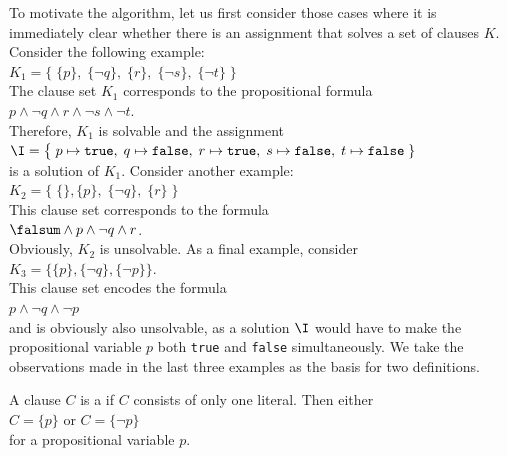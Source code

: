 To motivate the algorithm, let us first consider those cases where
it is immediately clear whether there is an assignment that solves a set of clauses $K$.
Consider the following example: \\[0.2cm]
\hspace*{1.3cm} 
$K_1 = \bigl\{\; \{p\},\; \{\neg q\},\; \{r\},\; \{\neg s\}, \; \{\neg t\} \;\bigr\}$ 
\\[0.2cm]
The clause set $K_1$ corresponds to the propositional formula
\\[0.2cm]
\hspace*{1.3cm}
$p \wedge \neg q \wedge r \wedge \neg s \wedge \neg t$.
\\[0.2cm]
Therefore, $K_1$ is solvable and the assignment  \\[0.2cm]
\hspace*{1.3cm} 
$\I = \bigl\{\; p \mapsto \texttt{true},\; q \mapsto \texttt{false},\; r \mapsto \texttt{true},\; s \mapsto
\texttt{false},\; t \mapsto \texttt{false}\;\}$
\\[0.2cm]
is a solution of $K_1$. Consider another example: \\[0.2cm]
\hspace*{1.3cm} 
$K_2 = \bigl\{\; \{\}, \{p\},\; \{\neg q\},\; \{r\}\; \bigr\}$ 
\\[0.2cm]
This clause set corresponds to the formula
\\[0.2cm]
\hspace*{1.3cm}
$\falsum \wedge p \wedge \neg q \wedge r$.
\\[0.2cm]
Obviously, $K_2$ is unsolvable. As a final example, consider
\\[0.2cm]
\hspace*{1.3cm} $K_3 = \bigl\{ \{p\}, \{\neg q\}, \{\neg p\} \bigr\}$.
\\[0.2cm]
This clause set encodes the formula
\\[0.2cm]
\hspace*{1.3cm}
$p \wedge \neg q \wedge \neg p $
\\[0.2cm]
and is obviously also unsolvable, as a solution $\I$ would have to make the propositional variable $p$ both
\texttt{true} and \texttt{false} simultaneously. We take the observations made in the last three examples as the basis for two
definitions.

\begin{Definition}
  A clause $C$ is a  if $C$ consists of only one literal.
  Then either
  \\[0.2cm]
  \hspace*{1.3cm}
  $C = \{p\}$ \quad or \quad $C = \{\neg p\}$ 
  \\[0.2cm]
  for a propositional variable $p$. \eox
\end{Definition}

